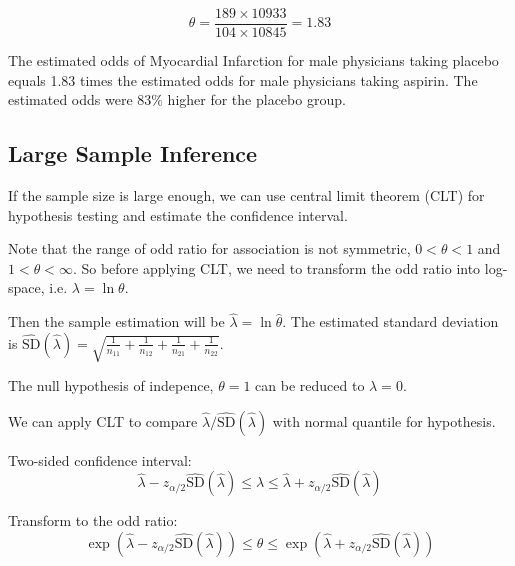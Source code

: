\[\theta = \frac{189 \times 10933}{104 \times 10845} = 1.83\]

The estimated odds of Myocardial Infarction for male physicians taking placebo equals
1.83 times the estimated odds for male physicians taking aspirin. The
estimated odds were $83\%$ higher for the placebo group.

\subsection{Large Sample Inference}
If the sample size is large enough, we can use central limit theorem (CLT) for hypothesis testing and estimate the confidence interval.

Note that the range of odd ratio for association is not symmetric, $0 < \theta < 1$ and $1 < \theta < \infty$. So before applying CLT, we need to transform the odd ratio into log-space, i.e. $\lambda = \ln \theta$. 

Then the sample estimation will be $\hat{\lambda} = \ln \hat{\theta}$. The estimated standard deviation is $\hat{\text{SD}} (\hat{\lambda}) = \sqrt{\frac{1}{n_{11}} +\frac{1}{n_{12}} + \frac{1}{n_{21}} + \frac{1}{n_{22}}}$.

The null hypothesis of indepence, $\theta = 1$ can be reduced to $\lambda = 0$.

We can apply CLT to compare $\hat{\lambda}/\hat{\text{SD}} (\hat{\lambda})$ with normal quantile for hypothesis.

Two-sided confidence interval:
\[
	\hat{\lambda} - z_{\alpha/2} \hat{\text{SD}}(\hat{\lambda}) 
	\le \lambda \le
	\hat{\lambda} + z_{\alpha/2} \hat{\text{SD}}(\hat{\lambda}) 
\]

Transform to the odd ratio:
\[
	\exp{(\hat{\lambda} - z_{\alpha/2} \hat{\text{SD}}(\hat{\lambda}))} 
	\le \theta \le
	\exp{(\hat{\lambda} + z_{\alpha/2} \hat{\text{SD}}(\hat{\lambda}))} 
\]
